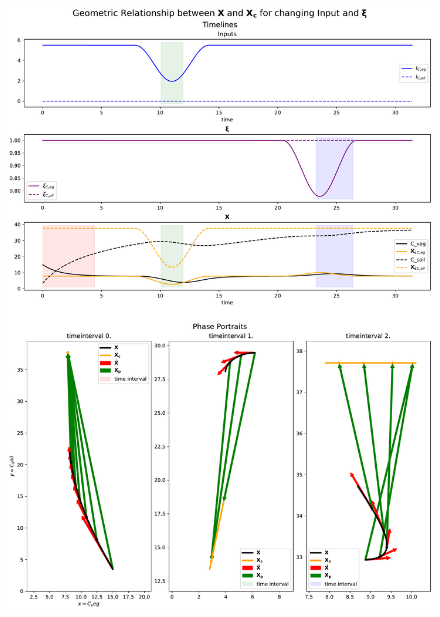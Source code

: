 \documentclass[journal abbreviation, manuscript]{copernicus}
\theoremstyle{definition}
\begin{document}
\begin{figure}[t]
\includegraphics[height=.9\textheight]{figures/combined_timelines_and_2d_phase_space.pdf}
\caption{
  \label{Xc2D}
}
\end{figure}
\end{document}
